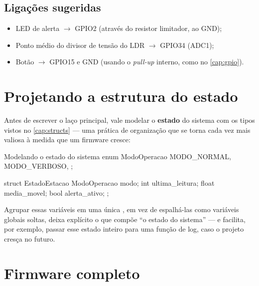 \subsection{Ligações sugeridas}

\begin{itemize}
    \item LED de alerta $\rightarrow$ GPIO2 (através do resistor limitador, ao GND);
    \item Ponto médio do divisor de tensão do LDR $\rightarrow$ GPIO34 (ADC1);
    \item Botão $\rightarrow$ GPIO15 e GND (usando o \emph{pull-up} interno, como no \cref{cap:gpio}).
\end{itemize}

\section{Projetando a estrutura do estado}

Antes de escrever o laço principal, vale modelar o \textbf{estado} do sistema com os tipos vistos no \cref{cap:structs} — uma prática de organização que se torna cada vez mais valiosa à medida que um firmware cresce:

\begin{codigoc}{Modelando o estado do sistema}
enum ModoOperacao {
    MODO_NORMAL,
    MODO_VERBOSO,
};

struct EstadoEstacao {
    ModoOperacao modo;
    int ultima_leitura;
    float media_movel;
    bool alerta_ativo;
};
\end{codigoc}

Agrupar essas variáveis em uma única , em vez de espalhá-las como variáveis globais soltas, deixa explícito o que compõe ``o estado do sistema'' — e facilita, por exemplo, passar esse estado inteiro para uma função de log, caso o projeto cresça no futuro.

\section{Firmware completo}

